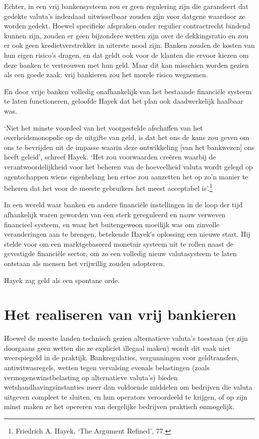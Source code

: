 \documentclass[
  a5paper,
  smalldemyvopaper,11pt,twoside,onecolumn,openright,extrafontsizes]{memoir}
\begin{document}
Echter, in een vrij bankensysteem zou er geen regulering zijn die
garandeert dat gedekte valuta's inderdaad uitwisselbaar zouden zijn voor
datgene waardoor ze worden gedekt. Hoewel specifieke afspraken onder
regulier contractrecht bindend kunnen zijn, zouden er geen bijzondere
wetten zijn over de dekkingsratio en zou er ook geen kredietverstrekker
in uiterste nood zijn. Banken zouden de kosten van hun eigen risico's
dragen, en dat geldt ook voor de klanten die ervoor kiezen om deze
banken te vertrouwen met hun geld. Maar dit kan misschien worden gezien
als een goede zaak: vrij bankieren zou het morele risico wegnemen.

En door vrije banken volledig onafhankelijk van het bestaande financiële
systeem te laten functioneren, geloofde Hayek dat het plan ook
daadwerkelijk haalbaar was.

`Niet het minste voordeel van het voorgestelde afschaffen van het
overheidsmonopolie op de uitgifte van geld, is dat het ons de kans zou
geven om ons te bevrijden uit de impasse waarin deze ontwikkeling {[}van
het bankwezen{]} ons heeft geleid', schreef Hayek. `Het zou voorwaarden
creëren waarbij de verantwoordelijkheid voor het beheren van de
hoeveelheid valuta wordt gelegd op agentschappen wiens eigenbelang hen
ertoe zou aanzetten het op zo'n manier te beheren dat het voor de meeste
gebruikers het meest acceptabel is'.\footnote{Friedrich A. Hayek, `The
  Argument Refined', 77.}

In een wereld waar banken en andere financiële instellingen in de loop
der tijd afhankelijk waren geworden van een sterk gereguleerd en nauw
verweven financieel systeem, en waar het buitengewoon moeilijk was om
zinvolle veranderingen aan te brengen, betekende Hayek's oplossing een
nieuwe start. Hij stelde voor om een marktgebaseerd monetair systeem uit
te rollen naast de gevestigde financiële sector, om zo een volledig
nieuw valutasysteem te laten ontstaan als mensen het vrijwillig zouden
adopteren.

Hayek zag geld als een spontane orde.

\section{Het realiseren van vrij
bankieren}\label{het-realiseren-van-vrij-bankieren}

Hoewel de meeste landen technisch gezien alternatieve valuta's toestaan
(er zijn doorgaans geen wetten die ze expliciet illegaal maken) wordt
dit vaak niet weerspiegeld in de praktijk. Bankregulaties, vergunningen
voor geldtransfers, antiwitwasregels, wetten tegen vervalsing evenals
belastingen (zoals vermogenswinstbelasting op alternatieve valuta's)
bieden wetshandhavingsinstanties meer dan voldoende middelen om
bedrijven die valuta uitgeven compleet te sluiten, en hun operators
veroordeeld te krijgen, of op zijn minst maken ze het opereren van
dergelijke bedrijven praktisch onmogelijk.
\end{document}
